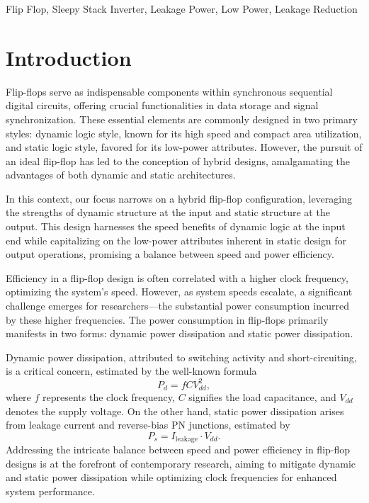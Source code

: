 \documentclass[conference]{IEEEtran}
\begin{document}
\begin{IEEEkeywords}
Flip Flop, Sleepy Stack Inverter, Leakage Power, Low Power, Leakage Reduction
\end{IEEEkeywords}

\section{Introduction}

Flip-flops serve as indispensable components within synchronous sequential digital circuits, offering crucial functionalities in data storage and signal synchronization. These essential elements are commonly designed in two primary styles: dynamic logic style, known for its high speed and compact area utilization, and static logic style, favored for its low-power attributes. However, the pursuit of an ideal flip-flop has led to the conception of hybrid designs, amalgamating the advantages of both dynamic and static architectures.

In this context, our focus narrows on a hybrid flip-flop configuration, leveraging the strengths of dynamic structure at the input and static structure at the output. This design harnesses the speed benefits of dynamic logic at the input end while capitalizing on the low-power attributes inherent in static design for output operations, promising a balance between speed and power efficiency.

Efficiency in a flip-flop design is often correlated with a higher clock frequency, optimizing the system's speed. However, as system speeds escalate, a significant challenge emerges for researchers---the substantial power consumption incurred by these higher frequencies. The power consumption in flip-flops primarily manifests in two forms: dynamic power dissipation and static power dissipation.

Dynamic power dissipation, attributed to switching activity and short-circuiting, is a critical concern, estimated by the well-known formula
\begin{equation}
P_{d} = f C V_{dd}^{2},
\end{equation}
where $f$ represents the clock frequency, $C$ signifies the load capacitance, and $V_{dd}$ denotes the supply voltage. On the other hand, static power dissipation arises from leakage current and reverse-bias PN junctions, estimated by
\begin{equation}
P_{s} = I_{\mathrm{leakage}} \cdot V_{dd}.
\end{equation}
Addressing the intricate balance between speed and power efficiency in flip-flop designs is at the forefront of contemporary research, aiming to mitigate dynamic and static power dissipation while optimizing clock frequencies for enhanced system performance.
\end{document}
